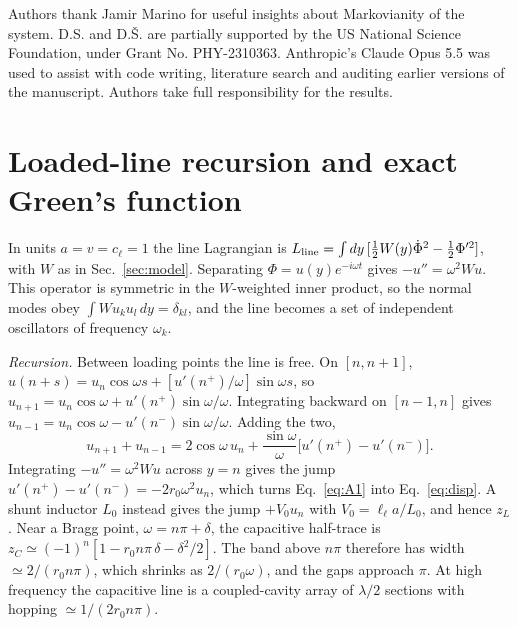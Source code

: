 \documentclass[aps,prresearch,twocolumn,superscriptaddress,nofootinbib,longbibliography,floatfix]{revtex4-2}
\begin{document}
\begin{acknowledgments}
Authors thank Jamir Marino for useful insights about Markovianity of the system. 
D.S. and D.\v{S}. are partially supported by the US National Science Foundation, under Grant No. PHY-2310363. Anthropic's Claude Opus 5.5 was used to assist with code writing, literature search and auditing earlier versions of the manuscript. Authors take full responsibility for the results.
\end{acknowledgments}



\appendix

\section{Loaded-line recursion and exact Green's function}\label{app:green}

In units $a=v=c_\ell=1$ the line Lagrangian is $L_{\rm line}=\int dy\,[\tfrac12W(y)\dot\Phi^2-\tfrac12\Phi'^2]$, with $W$
as in Sec.~\ref{sec:model}. Separating $\Phi=u(y)e^{-i\omega t}$ gives $-u''=\omega^2Wu$. This operator is symmetric in
the $W$-weighted inner product, so the normal modes obey $\int W u_ku_l\,dy=\delta_{kl}$, and the line becomes a set of
independent oscillators of frequency $\omega_k$.

\emph{Recursion.} Between loading points the line is free. On $[n,n+1]$,
$u(n+s)=u_n\cos\omega s+[u'(n^+)/\omega]\sin\omega s$, so $u_{n+1}=u_n\cos\omega+u'(n^+)\sin\omega/\omega$. Integrating
backward on $[n-1,n]$ gives $u_{n-1}=u_n\cos\omega-u'(n^-)\sin\omega/\omega$. Adding the two,
\begin{equation}
u_{n+1}+u_{n-1}=2\cos\omega\,u_n+\frac{\sin\omega}{\omega}\big[u'(n^+)-u'(n^-)\big].
\label{eq:A1}
\end{equation}
Integrating $-u''=\omega^2Wu$ across $y=n$ gives the jump $u'(n^+)-u'(n^-)=-2r_0\omega^2u_n$, which turns
Eq.~\eqref{eq:A1} into Eq.~\eqref{eq:disp}. A shunt inductor $L_0$ instead gives the jump $+V_0u_n$ with
$V_0=\ell_\ell a/L_0$, and hence $z_L$. Near a Bragg point, $\omega=n\pi+\delta$, the capacitive half-trace is
$z_C\simeq(-1)^n[1-r_0n\pi\,\delta-\delta^2/2]$. The band above $n\pi$ therefore has width $\simeq2/(r_0n\pi)$, which
shrinks as $2/(r_0\omega)$, and the gaps approach $\pi$. At high frequency the capacitive line is a coupled-cavity array
of $\lambda/2$ sections with hopping $\simeq1/(2r_0n\pi)$.
\end{document}
